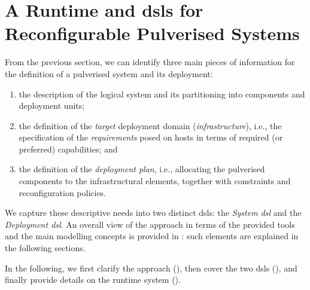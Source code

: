 \documentclass[conference]{IEEEtran}
\begin{document}
\newcommand{\dslSys}[0]{\emph{System \ac{dsl}}}
\newcommand{\dslDep}[0]{\emph{Deployment \ac{dsl}}}

\section{A Runtime and \acsp{dsl} for Reconfigurable Pulverised Systems}\label{sec:contribution}

From the previous section,
we can identify three main pieces of information for the definition of a pulverised system and its deployment:
\begin{enumerate}[label=\it{(\roman*)}]
  \item the description of the logical system and its partitioning into components and deployment units;
  \item the definition of the \emph{target} deployment domain (\emph{infrastructure}), i.e., the specification of the \emph{requirements} posed on hosts in terms of required (or preferred) capabilities; and
  \item the definition of the \emph{deployment plan}, i.e., allocating the pulverised components to the infrastructural elements, together with constraints and reconfiguration policies.
\end{enumerate}
%
We capture these %
 descriptive needs into two distinct \acp{dsl}: the \dslSys{} and the \dslDep{}.
%
An overall view of the approach in terms of the provided tools and the main modelling concepts is provided in : such elements are explained in the following sections.

In the following,
 we first clarify the approach (),
 then cover the two \acp{dsl}
 (),
 and finally provide details on the runtime system ().
\end{document}
